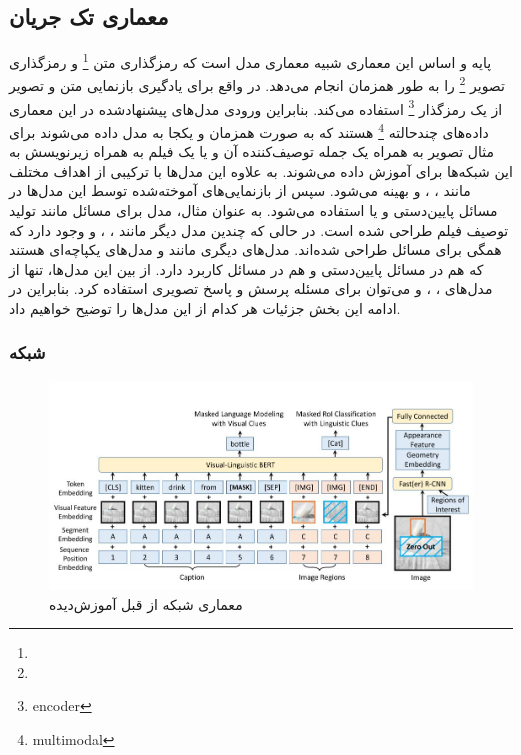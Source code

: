 \subsection[معماری تک جریان]{معماری تک جریان}
	پایه و اساس این معماری شبیه معماری مدل 
	\cite{devlin2018bert}
	است که رمزگذاری متن
	\footnote{}
	و رمزگذاری تصویر 
	\footnote{}
	را به طور همزمان انجام می‌دهد. در واقع برای یادگیری بازنمایی متن و تصویر از یک  رمزگذار
	\footnote{encoder}
	استفاده می‌کند. بنابراین ورودی مدل‌های پیشنهادشده در این معماری داده‌های چندحالته
	\footnote{multimodal}
	هستند که به صورت همزمان و یکجا به مدل داده می‌شوند برای مثال تصویر به همراه یک جمله توصیف‌کننده آن و یا یک فیلم به همراه زیرنویسش به این شبکه‌ها برای آموزش داده می‌شوند. به علاوه این مدل‌ها با ترکیبی از اهداف مختلف مانند 
	،
	،
	و 
   بهینه می‌شود. سپس از بازنمایی‌های آموخته‌شده توسط این مدل‌ها در مسائل پایین‌دستی 
   و یا 
   استفاده می‌شود. به عنوان مثال، مدل
	\cite{sun2019videobert}
	برای مسائل 
	مانند تولید توصیف فیلم طراحی شده است. در حالی که چندین مدل دیگر مانند
	\cite{alberti2019fusion}
	،
	 \cite{li2020unicoder}
	،
	\cite{su2019vl}
	و
	\cite{chen2020uniter}
	وجود دارد که همگی برای مسائل 
    طراحی شده‌اند. مدل‌های دیگری مانند
	\cite{zhou2020unified}
	و
	 \cite{li2020oscar}
	مدل‌های یکپاچه‌ای هستند که هم در مسائل پایین‌دستی 
	و هم در مسائل
	کاربرد دارد. از بین این مدل‌ها، تنها از مدل‌های
	،
	،
	و
	می‌توان برای مسئله پرسش و پاسخ تصویری استفاده کرد. بنابراین در ادامه این بخش جزئیات هر کدام از این مدل‌ها را توضیح خواهیم داد.
	
\subsubsection{  شبکه }
	\begin{figure}
		\centerline{\includegraphics[scale=0.5]{images/VLBERT.JPG}}
		\caption[معماری شبکه از قبل آموزش‌دیده ]{معماری شبکه از قبل آموزش‌دیده\cite{su2019vl}}
		\label{fig:VLBERT}
	\end{figure}

